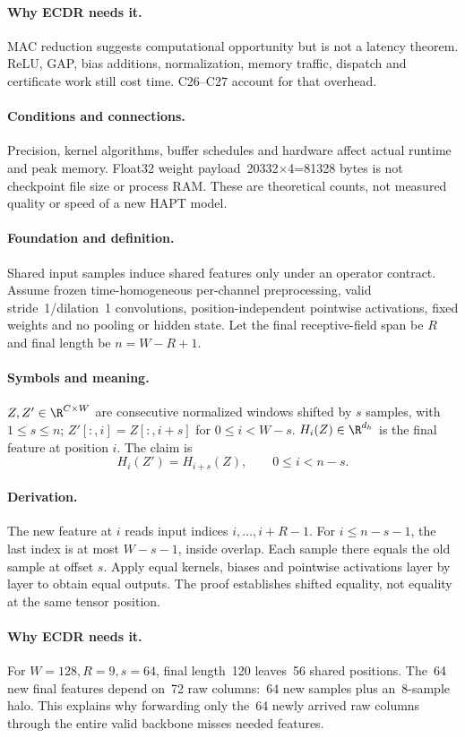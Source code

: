 \paragraph{Why ECDR needs it.}
MAC reduction suggests computational opportunity but is not a latency
theorem. ReLU, GAP, bias additions, normalization, memory traffic, dispatch
and certificate work still cost time. C26--C27 account for that overhead.
\paragraph{Conditions and connections.}
Precision, kernel algorithms, buffer schedules and hardware affect actual
runtime and peak memory. Float32 weight payload~20332$\times$4=81328 bytes
is not checkpoint file size or process RAM. These are theoretical counts,
not measured quality or speed of a new HAPT model.

\paragraph{Foundation and definition.}
Shared input samples induce shared features only under an operator contract.
Assume frozen time-homogeneous per-channel preprocessing, valid stride~1/dilation~1 convolutions,
position-independent pointwise activations, fixed weights and no pooling
or hidden state. Let the final receptive-field span be $R$ and final
length be $n=W-R+1$.
\paragraph{Symbols and meaning.}
$Z,Z'\in\R^{C\times W}$ are consecutive normalized windows shifted by
$s$ samples, with $1\le s\le n$;
$Z'[:,i]=Z[:,i+s]$ for $0\le i<W-s$.
$H_i(Z)\in\R^{d_h}$ is the final feature at position $i$.
The claim is
\[
 H_i(Z')=H_{i+s}(Z),\qquad 0\le i<n-s.
\]
\paragraph{Derivation.}
The new feature at $i$ reads input indices $i,\ldots,i+R-1$.
For $i\le n-s-1$, the last index is at most $W-s-1$, inside overlap.
Each sample there equals the old sample at offset $s$. Apply equal
kernels, biases and pointwise activations layer by layer to obtain equal
outputs. The proof establishes shifted equality, not equality at the same
tensor position.
\paragraph{Why ECDR needs it.}
For $W=128,R=9,s=64$, final length~120 leaves~56 shared positions.
The~64 new final features depend on~72 raw columns:~64 new samples plus
an~8-sample halo. This explains why forwarding only the~64 newly arrived
raw columns through the entire valid backbone misses needed features.
